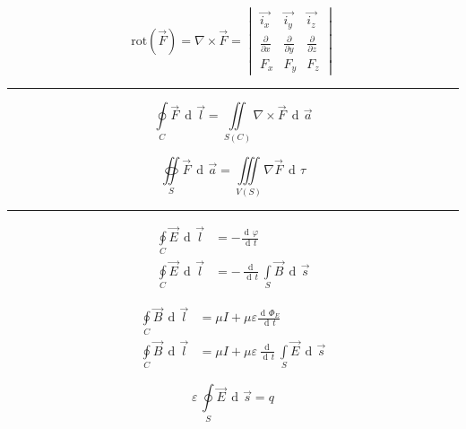 \documentclass[12pt]{article}
\DeclareMathOperator{\der}{\operatorname{d}\!}
\newcommand{\grayrule}{{\color{lightgray} \hrule}}
\begin{document}
\begin{multicols}{3}
\begin{equation*}
    \mathrm{rot}(\Vec{F}) = \nabla \times \Vec{F}
        = \begin{vmatrix}
        \Vec{i_x} & \Vec{i_y} & \Vec{i_z} \\
        \frac{\partial}{\partial x} & \frac{\partial}{\partial y} & \frac{\partial}{\partial z} \\
        F_x & F_y & F_z
        \end{vmatrix}
\end{equation*}

\grayrule
{ \color{m-gray}

    \begin{equation*}
        \oint\limits_C \Vec{F}\,\der \Vec{l}
            = \iint\limits_{S(C)} \nabla \times \Vec{F}\,\der\Vec{a} 
    \end{equation*}
    
    \begin{equation*}
        \oiint\limits_S \Vec{F} \, \der \Vec{a} = \iiint\limits_{V(S)} \nabla \Vec{F} \, \der\tau
    \end{equation*}
    
    \grayrule
    
    \begin{equation*}
        \begin{split}
            \oint\limits_C \Vec{E} \, \der\Vec{l} &= - \frac{\der\varphi}{\der t}\\
            \oint\limits_C \Vec{E} \, \der\Vec{l}
                &= - \frac{\der}{\der t} \int\limits_S \Vec{B} \, \der\Vec{s}
        \end{split}
    \end{equation*}
    
    \begin{equation*}
        \begin{split}
            \oint\limits_C \Vec{B} \, \der\Vec{l}
                &= \mu I + \mu \varepsilon \frac{\der\Phi_E}{\der t}\\
            \oint\limits_C \Vec{B} \, \der\Vec{l}
                &= \mu I + \mu \varepsilon \frac{\der}{\der t} \int\limits_S \Vec{E} \, \der\Vec{s}
        \end{split}
    \end{equation*}
    
    \begin{equation*}
        \varepsilon \, \oint\limits_S \Vec{E} \, \der\Vec{s} = q
    \end{equation*}
    
}
\end{multicols}
\end{document}
